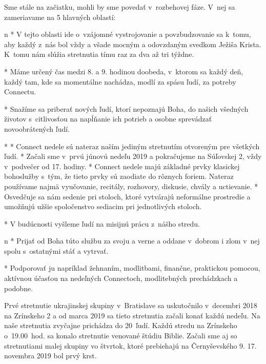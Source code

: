 Sme stále na začiatku, mohli by sme povedať v~rozbehovej fáze. V~nej sa zameriavame na 5 hlavných oblastí:

\begitems \style n
* 
V tejto oblasti ide o~vzájomné vystrojovanie a povzbudzovanie sa k~tomu, aby každý z~nás bol vždy a všade mocným a odovzdaným svedkom Ježiša Krista. K~tomu nám slúžia  stretnutia tímu raz za dva až tri týždne.

* 
Máme určený čas medzi 8. a 9. hodinou doobeda, v~ktorom sa každý deň, každý tam, kde sa momentálne nachádza, modlí za spásu ľudí, za potreby Connectu.

* 
Snažíme sa priberať nových ľudí, ktorí nepoznajú Boha, do našich všedných životov s~citlivosťou na napĺňanie ich potrieb a osobne sprevádzať novoobrátených ľudí.

* 
\begitems
* Connect nedele sú nateraz naším jediným stretnutím otvoreným pre všetkých ľudí.
* Začali sme v~prvú júnovú nedeľu 2019 a pokračujeme na Súľovskej 2, vždy v~podvečer od 17. hodiny.
* Connect nedele majú základné prvky klasickej bohoslužby s~tým, že tieto prvky sú zaodiate do rôznych foriem. Nateraz používame najmä vyučovanie, recitály, rozhovory, diskusie, chvály a uctievanie.
* Osvedčuje sa nám sedenie pri stoloch, ktoré vytvárajú neformálne prostredie a umožňujú užšie spoločenstvo sediacim pri jednotlivých stoloch.
\enditems

* 
V budúcnosti vyšleme ľudí na misijnú prácu z~nášho stredu.
\enditems


\begitems \style n
* 
Prijať od Boha túto službu za svoju a verne a oddane v~dobrom i zlom v~nej spolu s~ostatnými stáť a vytrvať.

* 
Podporovať ju napríklad žehnaním, modlitbami, finančne, praktickou pomocou, aktívnou účasťou na nedeľných Connectoch, modlitebných prechádzkach a podobne.
\enditems



Prvé stretnutie ukrajinskej skupiny v~Bratislave sa uskutočnilo v~decembri 2018 na Zrínskeho 2 a od marca 2019 sa tieto stretnutia začali konať každú nedeľu. Na naše stretnutia zvyčajne prichádza do 20~ľudí. Každú stredu na Zrínskeho o~19.00~hod. sa konalo stretnutie venované štúdiu Biblie. Začali sme aj so stretnutiami malej skupiny vo štvrtok, ktoré prebiehajú na Černyševského 9. 17. novembra 2019 bol prvý krst.

